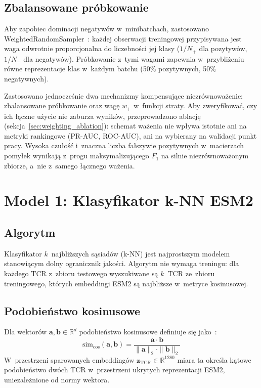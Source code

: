 \documentclass{SGGW-thesis}
\begin{document}
\subsection{Zbalansowane próbkowanie}

Aby zapobiec dominacji negatywów w~minibatchach, zastosowano WeightedRandomSampler~\cite{paszke2019}:
każdej obserwacji treningowej przypisywana jest waga odwrotnie proporcjonalna do liczebności jej
klasy ($1/N_+$ dla pozytywów, $1/N_-$ dla negatywów). Próbkowanie z~tymi wagami zapewnia w~przybliżeniu
równe reprezentacje klas w~każdym batchu (50\% pozytywnych, 50\% negatywnych).

Zastosowano jednocześnie dwa mechanizmy kompensujące niezrównoważenie: zbalansowane
próbkowanie oraz wagę $w_+$ w~funkcji straty. Aby zweryfikować, czy ich łączne użycie nie
zaburza wyników, przeprowadzono ablację (sekcja~\ref{sec:weighting_ablation}): schemat ważenia
nie wpływa istotnie ani na metryki rankingowe (PR-AUC, ROC-AUC), ani na wybierany na walidacji
punkt pracy. Wysoka czułość i~znaczna liczba fałszywie pozytywnych w~macierzach pomyłek wynikają
z~progu maksymalizującego $F_1$ na silnie niezrównoważonym zbiorze, a~nie z~samego łącznego ważenia.

\section{Model 1: Klasyfikator k-NN ESM2}

\subsection{Algorytm}

Klasyfikator $k$~najbliższych sąsiadów (k-NN) jest najprostszym modelem stanowiącym dolny ogranicznik
jakości. Algorytm nie wymaga treningu: dla każdego TCR z~zbioru testowego wyszukiwane są $k$~TCR
ze~zbioru treningowego, których embeddingi ESM2 są najbliższe w~metryce kosinusowej.

\subsection{Podobieństwo kosinusowe}

Dla wektorów $\mathbf{a}, \mathbf{b} \in \mathbb{R}^d$ podobieństwo kosinusowe definiuje się jako~\cite{manning2008}:
\begin{equation}
    \mathrm{sim}_{\cos}(\mathbf{a}, \mathbf{b}) = \frac{\mathbf{a} \cdot \mathbf{b}}{\|\mathbf{a}\|_2 \cdot \|\mathbf{b}\|_2}
    \label{eq:cosine}
\end{equation}
W~przestrzeni sparowanych embeddingów $\mathbf{z}_{\mathrm{TCR}} \in \mathbb{R}^{1280}$ miara ta
określa kątowe podobieństwo dwóch TCR w~przestrzeni ukrytych reprezentacji ESM2, uniezależnione
od normy wektora.
\end{document}
